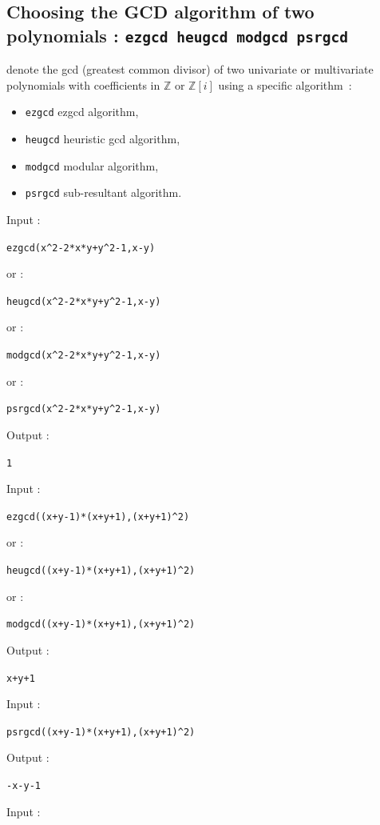 \documentclass[a4paper,11pt]{book}
\newcommand{\Z}{{\mathbb{Z}}}
\begin{document}
\subsection{Choosing  the GCD algorithm  of two polynomials : 
{\tt ezgcd heugcd modgcd psrgcd}}
 denote the gcd 
(greatest common divisor) of two univariate or multivariate
polynomials with coefficients
in $\Z$ or $\Z[i]$ using a specific algorithm~:
\begin{itemize}
\item {\tt ezgcd} ezgcd algorithm,
\item {\tt heugcd} heuristic gcd algorithm,
\item {\tt modgcd} modular algorithm,
\item {\tt psrgcd} sub-resultant algorithm.
\end{itemize}
Input :
\begin{center}{\tt ezgcd(x\verb|^|2-2*x*y+y\verb|^|2-1,x-y)}\end{center}
or :
\begin{center}{\tt heugcd(x\verb|^|2-2*x*y+y\verb|^|2-1,x-y)}\end{center}
or :
\begin{center}{\tt modgcd(x\verb|^|2-2*x*y+y\verb|^|2-1,x-y)}\end{center}
or :
\begin{center}{\tt psrgcd(x\verb|^|2-2*x*y+y\verb|^|2-1,x-y)}\end{center}
Output :
\begin{center}{\tt 1 }\end{center} 
Input :
\begin{center}{\tt ezgcd((x+y-1)*(x+y+1),(x+y+1)\verb|^|2)}\end{center}
or :
\begin{center}{\tt heugcd((x+y-1)*(x+y+1),(x+y+1)\verb|^|2)}\end{center}
or :
\begin{center}{\tt modgcd((x+y-1)*(x+y+1),(x+y+1)\verb|^|2)}\end{center}
Output :
\begin{center}{\tt x+y+1}\end{center}
Input :
\begin{center}{\tt psrgcd((x+y-1)*(x+y+1),(x+y+1)\verb|^|2)}\end{center}
Output :
\begin{center}{\tt -x-y-1}\end{center}
Input :
\end{document}
